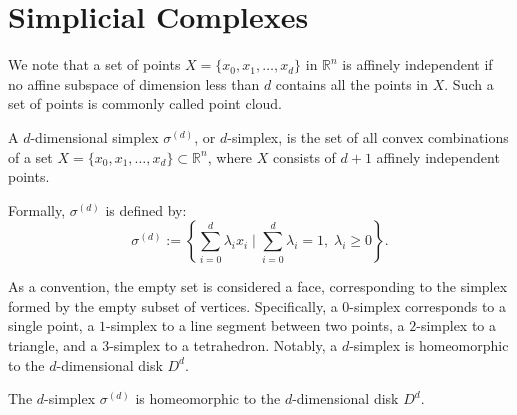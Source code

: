 \section{Simplicial Complexes}
\label{Simplicial Complexes} We note that a set of points
$X = \{x_{0}, x_{1}, \ldots, x_{d}\}$ in $\mathbb{R}^{n}$ is affinely
independent if no affine subspace
of dimension less than $d$ contains all the points in $X$. Such a set of points is
commonly called point cloud.

\begin{definition}[$d$-Simplex]{\cite[\S 2.1]{boissonnat2018geometric}}
\label{d-simplex} A $d$-dimensional
	simplex $\sigma^{(d)}$, or $d$-simplex, is the set of all convex combinations
	of a set $X = \{x_{0}, x_{1}, \ldots, x_{d}\} \subset \mathbb{R}^{n}$, where
	$X$ consists of $d+1$ affinely independent points.
	
	Formally, $\sigma^{(d)}$ is
	defined by:
	\begin{equation}
		\sigma^{(d)}:= \left\{\sum_{i=0}^{d}\lambda_{i} x_{i} \; | \; \sum_{i=0}^{d}\lambda
		_{i} = 1, \; \lambda_{i} \geq 0\right\}.
	\end{equation}
\end{definition}

As a convention, the empty set is considered a face, corresponding
to the simplex formed by the empty subset of vertices. Specifically, a $0$-simplex
corresponds to a single point, a $1$-simplex to a line segment between two
points, a $2$-simplex to a triangle, and a $3$-simplex to a tetrahedron. Notably,
a $d$-simplex is homeomorphic to the $d$-dimensional disk $D^{d}$.

\begin{theorem}
	The $d$-simplex $\sigma^{(d)}$ is homeomorphic to the $d$-dimensional disk $D^{d}$.
\end{theorem}

